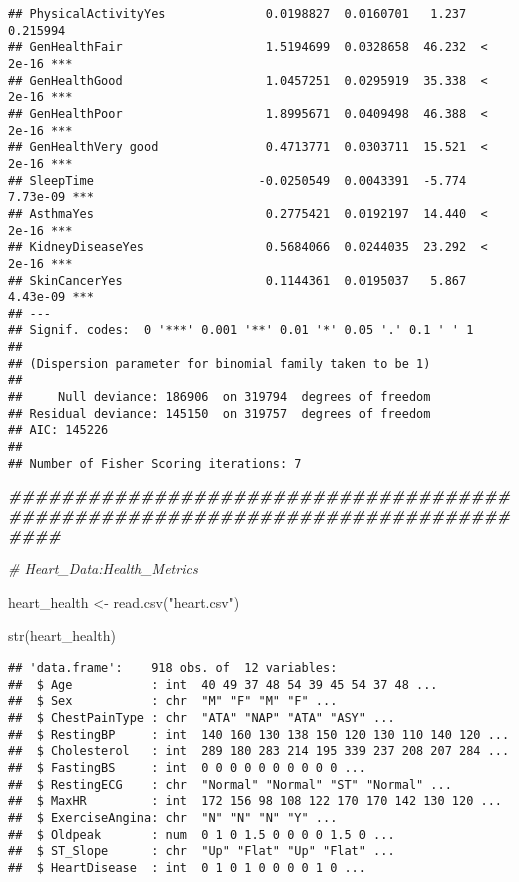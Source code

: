 \documentclass[
]{article}
\newenvironment{Shaded}{\begin{snugshade}}{\end{snugshade}}
\newcommand{\CommentTok}[1]{\textcolor[rgb]{0.56,0.35,0.01}{\textit{#1}}}
\newcommand{\DocumentationTok}[1]{\textcolor[rgb]{0.56,0.35,0.01}{\textbf{\textit{#1}}}}
\newcommand{\FunctionTok}[1]{\textcolor[rgb]{0.00,0.00,0.00}{#1}}
\newcommand{\NormalTok}[1]{#1}
\newcommand{\OtherTok}[1]{\textcolor[rgb]{0.56,0.35,0.01}{#1}}
\newcommand{\StringTok}[1]{\textcolor[rgb]{0.31,0.60,0.02}{#1}}
\begin{document}
\begin{verbatim}
## PhysicalActivityYes              0.0198827  0.0160701   1.237 0.215994    
## GenHealthFair                    1.5194699  0.0328658  46.232  < 2e-16 ***
## GenHealthGood                    1.0457251  0.0295919  35.338  < 2e-16 ***
## GenHealthPoor                    1.8995671  0.0409498  46.388  < 2e-16 ***
## GenHealthVery good               0.4713771  0.0303711  15.521  < 2e-16 ***
## SleepTime                       -0.0250549  0.0043391  -5.774 7.73e-09 ***
## AsthmaYes                        0.2775421  0.0192197  14.440  < 2e-16 ***
## KidneyDiseaseYes                 0.5684066  0.0244035  23.292  < 2e-16 ***
## SkinCancerYes                    0.1144361  0.0195037   5.867 4.43e-09 ***
## ---
## Signif. codes:  0 '***' 0.001 '**' 0.01 '*' 0.05 '.' 0.1 ' ' 1
## 
## (Dispersion parameter for binomial family taken to be 1)
## 
##     Null deviance: 186906  on 319794  degrees of freedom
## Residual deviance: 145150  on 319757  degrees of freedom
## AIC: 145226
## 
## Number of Fisher Scoring iterations: 7
\end{verbatim}

\begin{Shaded}
\begin{Highlighting}[]
\DocumentationTok{\#\#\#\#\#\#\#\#\#\#\#\#\#\#\#\#\#\#\#\#\#\#\#\#\#\#\#\#\#\#\#\#\#\#\#\#\#\#\#\#\#\#\#\#\#\#\#\#\#\#\#\#\#\#\#\#\#\#\#\#\#\#\#\#\#\#\#\#\#\#\#\#\#\#\#\#\#\#\#\#}

\CommentTok{\# Heart\_Data:Health\_Metrics}

\NormalTok{heart\_health }\OtherTok{\textless{}{-}} \FunctionTok{read.csv}\NormalTok{(}\StringTok{"heart.csv"}\NormalTok{)}

\FunctionTok{str}\NormalTok{(heart\_health)}
\end{Highlighting}
\end{Shaded}

\begin{verbatim}
## 'data.frame':    918 obs. of  12 variables:
##  $ Age           : int  40 49 37 48 54 39 45 54 37 48 ...
##  $ Sex           : chr  "M" "F" "M" "F" ...
##  $ ChestPainType : chr  "ATA" "NAP" "ATA" "ASY" ...
##  $ RestingBP     : int  140 160 130 138 150 120 130 110 140 120 ...
##  $ Cholesterol   : int  289 180 283 214 195 339 237 208 207 284 ...
##  $ FastingBS     : int  0 0 0 0 0 0 0 0 0 0 ...
##  $ RestingECG    : chr  "Normal" "Normal" "ST" "Normal" ...
##  $ MaxHR         : int  172 156 98 108 122 170 170 142 130 120 ...
##  $ ExerciseAngina: chr  "N" "N" "N" "Y" ...
##  $ Oldpeak       : num  0 1 0 1.5 0 0 0 0 1.5 0 ...
##  $ ST_Slope      : chr  "Up" "Flat" "Up" "Flat" ...
##  $ HeartDisease  : int  0 1 0 1 0 0 0 0 1 0 ...
\end{verbatim}
\end{document}
